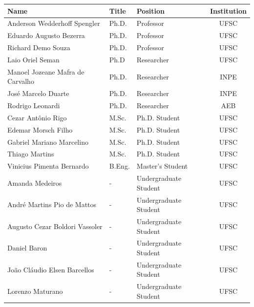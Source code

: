 \begin{table}[ht]
    \centering
    \begin{tabular}{lllc}
        \toprule[1.5pt]
        \textbf{Name} & \textbf{Title} & \textbf{Position} & \textbf{Institution} \\
        \midrule
        Anderson Wedderhoff Spengler        & Ph.D.     & Professor             & UFSC \\
        Eduardo Augusto Bezerra             & Ph.D.     & Professor             & UFSC \\
        Richard Demo Souza                  & Ph.D.     & Professor             & UFSC \\
        Laio Oriel Seman                    & Ph.D      & Researcher            & UFSC \\
        Manoel Jozeane Mafra de Carvalho    & Ph.D.     & Researcher            & INPE \\
        José Marcelo Duarte                 & Ph.D.     & Researcher            & INPE \\
        Rodrigo Leonardi                    & Ph.D.     & Researcher            & AEB \\
        Cezar Antônio Rigo                  & M.Sc.     & Ph.D. Student         & UFSC \\
        Edemar Morsch Filho                 & M.Sc.     & Ph.D. Student         & UFSC \\
        Gabriel Mariano Marcelino           & M.Sc.     & Ph.D. Student         & UFSC \\
        Thiago Martins                      & M.Sc.     & Ph.D. Student         & UFSC \\
        Vinicius Pimenta Bernardo           & B.Eng.    & Master's Student      & UFSC \\
        Amanda Medeiros                     & -         & Undergraduate Student & UFSC \\
        André Martins Pio de Mattos         & -         & Undergraduate Student & UFSC \\
        Augusto Cezar Boldori Vassoler      & -         & Undergraduate Student & UFSC \\
        Daniel Baron                        & -         & Undergraduate Student & UFSC \\
        João Cláudio Elsen Barcellos        & -         & Undergraduate Student & UFSC \\
        Lorenzo Maturano                    & -         & Undergraduate Student & UFSC \\

\end{tabular}
\end{table}
